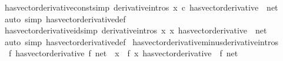 \begin{isabellebody}
\endisatagproof
{\isafoldproof}%
%
\isadelimproof
\isanewline
%
\endisadelimproof
\isanewline
{}\isamarkupfalse%
\ has{\isacharunderscore}{\kern0pt}vector{\isacharunderscore}{\kern0pt}derivative{\isacharunderscore}{\kern0pt}const{\isacharbrackleft}{\kern0pt}simp{\isacharcomma}{\kern0pt}\ derivative{\isacharunderscore}{\kern0pt}intros{\isacharbrackright}{\kern0pt}{\isacharcolon}{\kern0pt}\ {\isachardoublequoteopen}{\isacharparenleft}{\kern0pt}{\isacharparenleft}{\kern0pt}{\isasymlambda}x{\isachardot}{\kern0pt}\ c{\isacharparenright}{\kern0pt}\ has{\isacharunderscore}{\kern0pt}vector{\isacharunderscore}{\kern0pt}derivative\ {}{\isacharparenright}{\kern0pt}\ net{\isachardoublequoteclose}\isanewline
%
\isadelimproof
\ \ %
\endisadelimproof
%
\isatagproof
{}\isamarkupfalse%
\ {\isacharparenleft}{\kern0pt}auto\ simp{\isacharcolon}{\kern0pt}\ has{\isacharunderscore}{\kern0pt}vector{\isacharunderscore}{\kern0pt}derivative{\isacharunderscore}{\kern0pt}def{\isacharparenright}{\kern0pt}%
\endisatagproof
{\isafoldproof}%
%
\isadelimproof
\isanewline
%
\endisadelimproof
\isanewline
{}\isamarkupfalse%
\ has{\isacharunderscore}{\kern0pt}vector{\isacharunderscore}{\kern0pt}derivative{\isacharunderscore}{\kern0pt}id{\isacharbrackleft}{\kern0pt}simp{\isacharcomma}{\kern0pt}\ derivative{\isacharunderscore}{\kern0pt}intros{\isacharbrackright}{\kern0pt}{\isacharcolon}{\kern0pt}\ {\isachardoublequoteopen}{\isacharparenleft}{\kern0pt}{\isacharparenleft}{\kern0pt}{\isasymlambda}x{\isachardot}{\kern0pt}\ x{\isacharparenright}{\kern0pt}\ has{\isacharunderscore}{\kern0pt}vector{\isacharunderscore}{\kern0pt}derivative\ {}{\isacharparenright}{\kern0pt}\ net{\isachardoublequoteclose}\isanewline
%
\isadelimproof
\ \ %
\endisadelimproof
%
\isatagproof
{}\isamarkupfalse%
\ {\isacharparenleft}{\kern0pt}auto\ simp{\isacharcolon}{\kern0pt}\ has{\isacharunderscore}{\kern0pt}vector{\isacharunderscore}{\kern0pt}derivative{\isacharunderscore}{\kern0pt}def{\isacharparenright}{\kern0pt}%
\endisatagproof
{\isafoldproof}%
%
\isadelimproof
\isanewline
%
\endisadelimproof
\isanewline
{}\isamarkupfalse%
\ has{\isacharunderscore}{\kern0pt}vector{\isacharunderscore}{\kern0pt}derivative{\isacharunderscore}{\kern0pt}minus{\isacharbrackleft}{\kern0pt}derivative{\isacharunderscore}{\kern0pt}intros{\isacharbrackright}{\kern0pt}{\isacharcolon}{\kern0pt}\isanewline
\ \ {\isachardoublequoteopen}{\isacharparenleft}{\kern0pt}f\ has{\isacharunderscore}{\kern0pt}vector{\isacharunderscore}{\kern0pt}derivative\ f{\isacharprime}{\kern0pt}{\isacharparenright}{\kern0pt}\ net\ {\isasymLongrightarrow}\ {\isacharparenleft}{\kern0pt}{\isacharparenleft}{\kern0pt}{\isasymlambda}x{\isachardot}{\kern0pt}\ {\isacharminus}{\kern0pt}\ f\ x{\isacharparenright}{\kern0pt}\ has{\isacharunderscore}{\kern0pt}vector{\isacharunderscore}{\kern0pt}derivative\ {\isacharparenleft}{\kern0pt}{\isacharminus}{\kern0pt}\ f{\isacharprime}{\kern0pt}{\isacharparenright}{\kern0pt}{\isacharparenright}{\kern0pt}\ net{\isachardoublequoteclose}\isanewline

\end{isabellebody}
